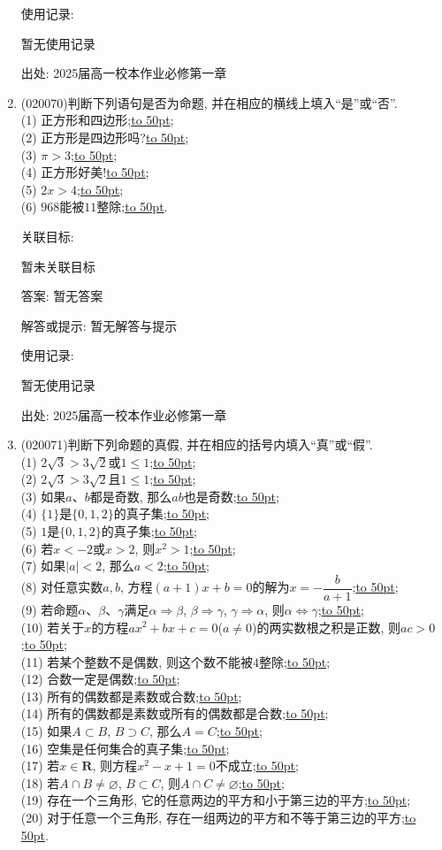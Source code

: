 \documentclass[10pt,a4paper]{article}
\newcommand{\blank}[1]{\underline{\hbox to #1pt{}}}
\begin{document}
\begin{enumerate}[1.]
使用记录:

暂无使用记录


出处: 2025届高一校本作业必修第一章
\item { (020070)}判断下列语句是否为命题, 并在相应的横线上填入``是''或``否''.\\
(1) 正方形和四边形;\blank{50};\\
(2) 正方形是四边形吗?\blank{50};\\
(3) $\pi>3$;\blank{50};\\
(4) 正方形好美!\blank{50};\\
(5) $2x>4$;\blank{50};\\
(6) $968$能被$11$整除;\blank{50}.


关联目标:

暂未关联目标

答案: 暂无答案

解答或提示: 暂无解答与提示

使用记录:

暂无使用记录


出处: 2025届高一校本作业必修第一章
\item { (020071)}判断下列命题的真假, 并在相应的括号内填入``真''或``假''.\\
(1) $2\sqrt 3>3\sqrt 2$或$1\le 1$;\blank{50};\\
(2) $2\sqrt 3>3\sqrt 2$且$1\le1$;\blank{50};\\
(3) 如果$a$、$b$都是奇数, 那么$ab$也是奇数;\blank{50};\\
(4) $\{1\}$是$\{0, 1, 2\}$的真子集;\blank{50};\\
(5) $1$是$\{0, 1, 2\}$的真子集;\blank{50};\\
(6) 若$x<-2$或$x>2$, 则$x^2>1$;\blank{50};\\
(7) 如果$|a|<2$, 那么$a<2$;\blank{50};\\
(8) 对任意实数$a,b$, 方程$(a+1)x+b=0$的解为$x=-\dfrac b{a+1}$;\blank{50};\\
(9) 若命题$\alpha$、$\beta$、$\gamma$满足$\alpha\Rightarrow \beta$, $\beta\Rightarrow \gamma$, $\gamma\Rightarrow \alpha$, 则$\alpha\Leftrightarrow \gamma$;\blank{50};\\
(10) 若关于$x$的方程$ax^2+bx+c=0$($a\ne 0$)的两实数根之积是正数, 则$ac>0$;\blank{50};\\
(11) 若某个整数不是偶数, 则这个数不能被$4$整除;\blank{50};\\
(12) 合数一定是偶数;\blank{50};\\
(13) 所有的偶数都是素数或合数;\blank{50};\\
(14) 所有的偶数都是素数或所有的偶数都是合数;\blank{50};\\
(15) 如果$A\subset B$, $B\supset C$, 那么$A=C$;\blank{50};\\
(16) 空集是任何集合的真子集;\blank{50};\\
(17) 若$x\in \mathbf{R}$, 则方程$x^2-x+1=0$不成立;\blank{50};\\
(18) 若$A\cap B\ne \varnothing$, $B\subset C$, 则$A\cap C\ne \varnothing$;\blank{50};\\
(19) 存在一个三角形, 它的任意两边的平方和小于第三边的平方;\blank{50};\\
(20) 对于任意一个三角形, 存在一组两边的平方和不等于第三边的平方;\blank{50}.



\end{enumerate}
\end{document}

